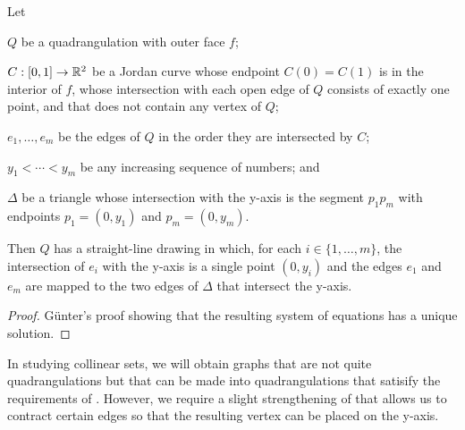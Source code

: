 \documentclass{patmorin}
\begin{document}
%



\begin{lem}
    Let
    \begin{compactitem}
    \item $Q$ be a quadrangulation with outer face $f$; 
    \item $C:[0,1]\to\mathbb{R}^2$ be a Jordan curve whose endpoint $C(0)=C(1)$ is
     in the interior of $f$,
     whose intersection with each open edge of $Q$
     consists of exactly one point, and that does not contain
     any vertex of $Q$; 
    \item $e_1,\ldots,e_m$ be the edges of $Q$ in the
    order they are intersected by $C$; 
    \item $y_1<\cdots<y_m$
    be any increasing sequence of numbers; and
    \item $\Delta$ be a triangle whose intersection with the y-axis
     is the segment $p_1p_m$ with endpoints $p_1=(0,y_1)$ and $p_m=(0,y_m)$.
    \end{compactitem}
    Then $Q$ has a straight-line
    drawing in which, for each $i\in\{1,\ldots,m\}$, the intersection
    of $e_i$ with the y-axis is a single point $(0,y_i)$ and the edges
    $e_1$ and $e_m$ are mapped to the two edges of $\Delta$ that
    intersect the y-axis.
\end{lem}

\begin{proof}
   G\"unter's proof showing that the resulting system of equations has
   a unique solution.
\end{proof}

In studying collinear sets, we will obtain graphs that are not quite
quadrangulations but that can be made into quadrangulations that
satisify the requirements of . However, we require a slight
strengthening of  that allows us to contract certain edges
so that the resulting vertex can be placed on the y-axis.
\end{document}
